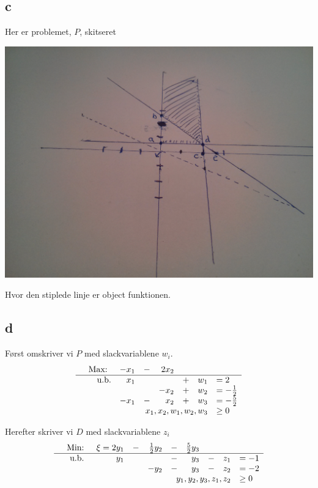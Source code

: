 \documentclass[12pt]{article}
\begin{document}
\subsection*{c}
Her er problemet, $P$, skitseret
\begin{center}
\includegraphics[scale=0.1]{1}
\end{center}
Hvor den stiplede linje er object funktionen.

\subsection*{d}
Først omskriver vi $P$ med slackvariablene $w_i$.
\begin{equation}
\begin{array}{rrrrrrrl}
&\text{Max: } & -x_1 &- &2x_2 & \\
\hline
&\text{u.b.} &x_1 & & & + &w_1&= 2 \\
& & & &-x_2 &+ &w_2 &= -\frac{1}{2} \\
& &-x_1 &- &x_2 &+ &w_3 &= -\frac{5}{2} \\
& & &\multicolumn{4}{r} {x_1,x_2,w_1,w_2,w_3} &\geq 0
\end{array}
\end{equation}

Herefter skriver vi $D$ med slackvariablene $z_i$
\begin{equation}
\begin{array}{rrrrrrrrrl}
&\text{Min: } &\xi=2y_1 &- &\frac{1}{2}y_2 &- &\frac{5}{2}y_3 & \\
\hline
&\text{u.b. } &y_1 & & &- &y_3 &- &z_1 &= -1 \\
& & & &-y_2 &- &y_3 &- &z_2 &= -2 \\
& & & &\multicolumn{5}{r} {y_1,y_2,y_3,z_1,z_2} &\geq 0
\end{array}
\end{equation}
\end{document}
